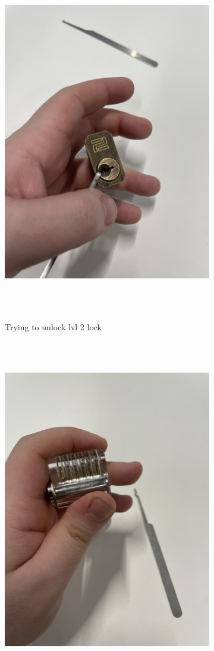 \documentclass[12pt, letterpaper]{article}
\begin{document}
\begin{figure}[!ht]
    \centering
    \begin{subfigure}{.5\textwidth}
        \centering
        \includegraphics[width=.8\linewidth]{PDFs/Week 2/Lock pick lvl2.jpeg}
        \caption{Trying to unlock lvl 2 lock}
    \end{subfigure}%
    \begin{subfigure}{.5\textwidth}
        \centering
        \includegraphics[width=.8\linewidth]{PDFs/Week 2/Lock picking lvl5.jpeg}

\end{subfigure}
\end{figure}
\end{document}
